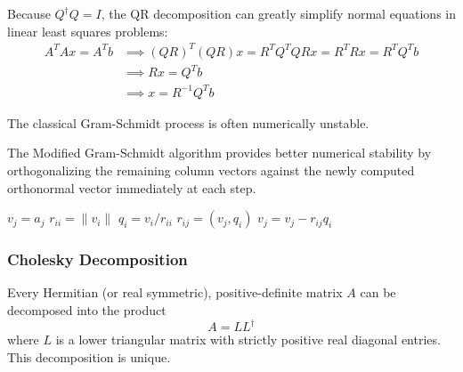   Because $Q^\dagger Q = I$, the QR decomposition can greatly simplify normal equations in linear least squares problems:
  \begin{align}
    A^T A x = A^T b & \implies (Q R)^T (Q R) x = R^T Q^T Q R x = R^T R x = R^T Q^T b \\
    & \implies R x = Q^T b \\
    & \implies x = R^{-1} Q^T b
  \end{align}

  The classical Gram-Schmidt process is often numerically unstable. 

  \begin{algo}
    The Modified Gram-Schmidt algorithm provides better numerical stability by orthogonalizing the remaining column vectors against the newly computed orthonormal vector immediately at each step. 
    \begin{algorithmic}[1]
        \STATE $v_j = a_j$
      \ENDFOR
        \STATE $r_{ii} = \|v_i\|$
        \STATE $q_i = v_i / r_{ii}$
          \STATE $r_{ij} = (v_j, q_i)$
          \STATE $v_j = v_j - r_{ij} q_i$
        \ENDFOR
      \ENDFOR
    \end{algorithmic}
  \end{algo}

\subsubsection{Cholesky Decomposition}

  \begin{definition}
    Every Hermitian (or real symmetric), positive-definite matrix $A$ can be decomposed into the product
    \begin{equation}
      A = L L^\dagger
    \end{equation}
    where $L$ is a lower triangular matrix with strictly positive real diagonal entries. This decomposition is unique.
  \end{definition}

